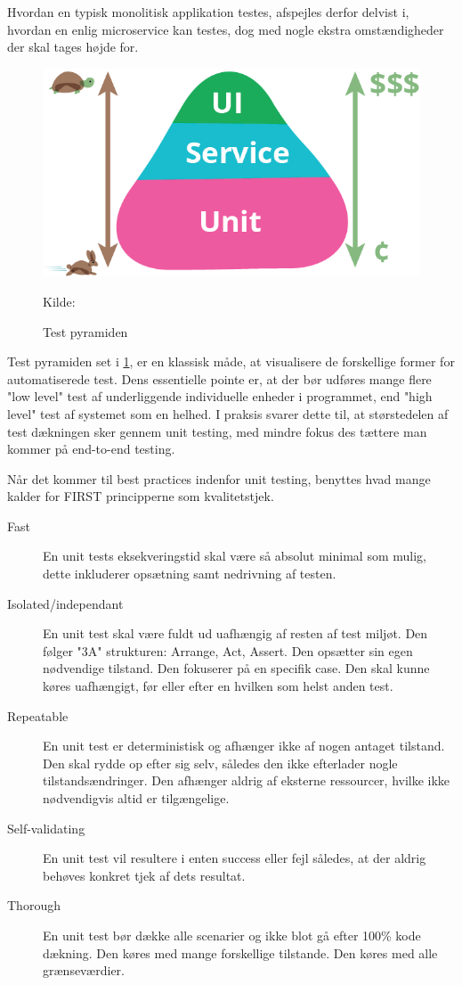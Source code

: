 \documentclass{article}
\newcommand{\source}[1]{\caption*{\hfill Kilde: {#1}} }
\begin{document}
Hvordan en typisk monolitisk applikation testes, afspejles derfor delvist i, hvordan en enlig microservice kan testes, dog med nogle ekstra omstændigheder der skal tages højde for.

\begin{figure}[H]
    \includegraphics[width=\textwidth]{images/test-pyramid.png}
    \caption{Test pyramiden}
    \source{\cite{fowler:test-pyramid}}
    \label{fig:test-pyramid}
\end{figure}

Test pyramiden set i \cref{fig:test-pyramid}, er en klassisk måde, at visualisere de forskellige former for automatiserede test. Dens essentielle pointe er, at der bør udføres mange flere "low level" test af underliggende individuelle enheder i programmet, end "high level" test af systemet som en helhed. I praksis svarer dette til, at størstedelen af test dækningen sker gennem unit testing, med mindre fokus des tættere man kommer på end-to-end testing.

Når det kommer til best practices indenfor unit testing, benyttes hvad mange kalder for FIRST principperne som kvalitetstjek.

\begin{description}
    \item[Fast] En unit tests eksekveringstid skal være så absolut minimal som mulig, dette inkluderer opsætning samt nedrivning af testen.
    \item[Isolated/independant] En unit test skal være fuldt ud uafhængig af resten af test miljøt. Den følger "3A" strukturen: Arrange, Act, Assert. Den opsætter sin egen nødvendige tilstand. Den fokuserer på en specifik case. Den skal kunne køres uafhængigt, før eller efter en hvilken som helst anden test.
    \item[Repeatable] En unit test er deterministisk og afhænger ikke af nogen antaget tilstand. Den skal rydde op efter sig selv, således den ikke efterlader nogle tilstandsændringer. Den afhænger aldrig af eksterne ressourcer, hvilke ikke nødvendigvis altid er tilgængelige.
    \item[Self-validating] En unit test vil resultere i enten success eller fejl således, at der aldrig behøves konkret tjek af dets resultat.
    \item[Thorough] En unit test bør dække alle scenarier og ikke blot gå efter 100\% kode dækning. Den køres med mange forskellige tilstande. Den køres med alle grænseværdier.
\end{description}
\end{document}
